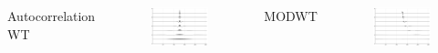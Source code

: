 \documentclass[aspectratio=169]{beamer}
\begin{document}
\begin{frame}
    \begin{columns}
        \centering
            Autocorrelation WT
        \begin{figure}
            \includegraphics[width=\textwidth, height=0.5\textheight]{auto_decomposition.png}
        \end{figure}
        \centering
            MODWT
            \begin{figure}
            \includegraphics[width=\textwidth, height=0.5\textheight]{wavelet_decomposition.png}
            \end{figure}
    \end{columns}
\end{frame}
\end{document}
